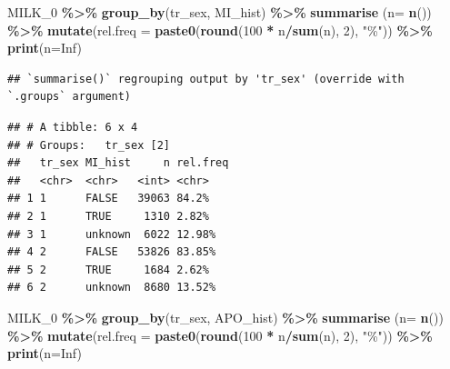 \documentclass[
]{article}
\newenvironment{Shaded}{\begin{snugshade}}{\end{snugshade}}
\newcommand{\DataTypeTok}[1]{\textcolor[rgb]{0.13,0.29,0.53}{#1}}
\newcommand{\DecValTok}[1]{\textcolor[rgb]{0.00,0.00,0.81}{#1}}
\newcommand{\KeywordTok}[1]{\textcolor[rgb]{0.13,0.29,0.53}{\textbf{#1}}}
\newcommand{\NormalTok}[1]{#1}
\newcommand{\OperatorTok}[1]{\textcolor[rgb]{0.81,0.36,0.00}{\textbf{#1}}}
\newcommand{\OtherTok}[1]{\textcolor[rgb]{0.56,0.35,0.01}{#1}}
\newcommand{\StringTok}[1]{\textcolor[rgb]{0.31,0.60,0.02}{#1}}
\begin{document}
\begin{Shaded}
\begin{Highlighting}[]
\NormalTok{MILK\_}\DecValTok{0} \OperatorTok{\%\textgreater{}\%}\StringTok{ }
\StringTok{  }\KeywordTok{group\_by}\NormalTok{(tr\_sex, MI\_hist) }\OperatorTok{\%\textgreater{}\%}\StringTok{ }
\StringTok{  }\KeywordTok{summarise}\NormalTok{ (}\DataTypeTok{n=} \KeywordTok{n}\NormalTok{()) }\OperatorTok{\%\textgreater{}\%}
\StringTok{  }\KeywordTok{mutate}\NormalTok{(}\DataTypeTok{rel.freq =} \KeywordTok{paste0}\NormalTok{(}\KeywordTok{round}\NormalTok{(}\DecValTok{100} \OperatorTok{*}\StringTok{ }\NormalTok{n}\OperatorTok{/}\KeywordTok{sum}\NormalTok{(n), }\DecValTok{2}\NormalTok{), }\StringTok{"\%"}\NormalTok{))  }\OperatorTok{\%\textgreater{}\%}\StringTok{ }
\StringTok{  }\KeywordTok{print}\NormalTok{(}\DataTypeTok{n=}\OtherTok{Inf}\NormalTok{)}
\end{Highlighting}
\end{Shaded}

\begin{verbatim}
## `summarise()` regrouping output by 'tr_sex' (override with `.groups` argument)
\end{verbatim}

\begin{verbatim}
## # A tibble: 6 x 4
## # Groups:   tr_sex [2]
##   tr_sex MI_hist     n rel.freq
##   <chr>  <chr>   <int> <chr>   
## 1 1      FALSE   39063 84.2%   
## 2 1      TRUE     1310 2.82%   
## 3 1      unknown  6022 12.98%  
## 4 2      FALSE   53826 83.85%  
## 5 2      TRUE     1684 2.62%   
## 6 2      unknown  8680 13.52%
\end{verbatim}

\begin{Shaded}
\begin{Highlighting}[]
\NormalTok{MILK\_}\DecValTok{0} \OperatorTok{\%\textgreater{}\%}\StringTok{ }
\StringTok{  }\KeywordTok{group\_by}\NormalTok{(tr\_sex, APO\_hist) }\OperatorTok{\%\textgreater{}\%}\StringTok{ }
\StringTok{  }\KeywordTok{summarise}\NormalTok{ (}\DataTypeTok{n=} \KeywordTok{n}\NormalTok{()) }\OperatorTok{\%\textgreater{}\%}
\StringTok{  }\KeywordTok{mutate}\NormalTok{(}\DataTypeTok{rel.freq =} \KeywordTok{paste0}\NormalTok{(}\KeywordTok{round}\NormalTok{(}\DecValTok{100} \OperatorTok{*}\StringTok{ }\NormalTok{n}\OperatorTok{/}\KeywordTok{sum}\NormalTok{(n), }\DecValTok{2}\NormalTok{), }\StringTok{"\%"}\NormalTok{))  }\OperatorTok{\%\textgreater{}\%}\StringTok{ }
\StringTok{  }\KeywordTok{print}\NormalTok{(}\DataTypeTok{n=}\OtherTok{Inf}\NormalTok{)}
\end{Highlighting}
\end{Shaded}
\end{document}
